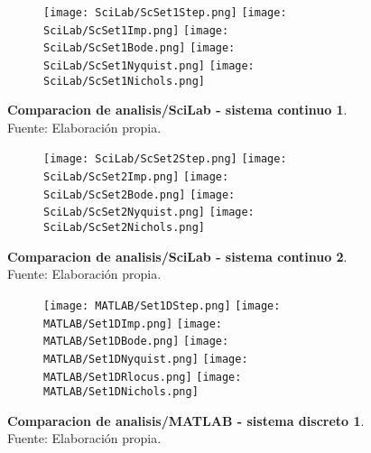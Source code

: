     \begin{figure}[htb]
        \centering
        \begin{subfigure}[t]{0.99\textwidth}
            \centering
            \texttt{[image: SciLab/ScSet1Step.png]}
            \texttt{[image: SciLab/ScSet1Imp.png]}
            \texttt{[image: SciLab/ScSet1Bode.png]}
            \texttt{[image: SciLab/ScSet1Nyquist.png]}
            \texttt{[image: SciLab/ScSet1Nichols.png]}
            \label{fig:ScSet1sub}
        \end{subfigure}
        \caption[Comparacion de analisis/SciLab - sistema continuo 1]{\textbf{Comparacion de analisis/SciLab - sistema continuo 1}. Fuente: Elaboración propia. \label{fig:ScSet1}}
    \end{figure}

    \begin{figure}[htb]
        \centering
        \begin{subfigure}[t]{0.99\textwidth}
            \centering
            \texttt{[image: SciLab/ScSet2Step.png]}
            \texttt{[image: SciLab/ScSet2Imp.png]}
            \texttt{[image: SciLab/ScSet2Bode.png]}
            \texttt{[image: SciLab/ScSet2Nyquist.png]}
            \texttt{[image: SciLab/ScSet2Nichols.png]}
            \label{fig:ScSet2sub}
        \end{subfigure}
        \caption[Comparacion de analisis/SciLab - sistema continuo 2]{\textbf{Comparacion de analisis/SciLab - sistema continuo 2}. Fuente: Elaboración propia. \label{fig:ScSet2}}
    \end{figure}

    \begin{figure}[htb]
        \centering
        \begin{subfigure}[t]{0.99\textwidth}
            \centering
            \texttt{[image: MATLAB/Set1DStep.png]}
            \texttt{[image: MATLAB/Set1DImp.png]}
            \texttt{[image: MATLAB/Set1DBode.png]}
            \texttt{[image: MATLAB/Set1DNyquist.png]}
            \texttt{[image: MATLAB/Set1DRlocus.png]}
            \texttt{[image: MATLAB/Set1DNichols.png]}
            \label{fig:Set1Dsub}
        \end{subfigure}
        \caption[Comparacion de analisis/MATLAB - sistema discreto 1]{\textbf{Comparacion de analisis/MATLAB - sistema discreto 1}. Fuente: Elaboración propia. \label{fig:Set1D}}
    \end{figure}

